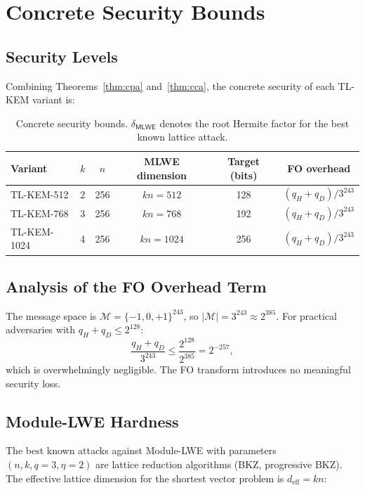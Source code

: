\documentclass[11pt,a4paper]{article}
\theoremstyle{definition}
\newcommand{\MLWE}{\textsf{MLWE}}
\begin{document}
\section{Concrete Security Bounds}
\label{sec:concrete}

\subsection{Security Levels}

Combining Theorems~\ref{thm:cpa} and~\ref{thm:cca}, the concrete security of each TL-KEM variant is:

\begin{table}[ht]
\centering
\caption{Concrete security bounds. $\delta_{\MLWE}$ denotes the root Hermite factor for the best known lattice attack.}
\label{tab:concrete}
\begin{tabular}{@{}lccccc@{}}
\toprule
Variant & $k$ & $n$ & MLWE dimension & Target (bits) & FO overhead \\
\midrule
TL-KEM-512  & 2 & 256 & $kn = 512$  & 128 & $(q_H+q_D)/3^{243}$ \\
TL-KEM-768  & 3 & 256 & $kn = 768$  & 192 & $(q_H+q_D)/3^{243}$ \\
TL-KEM-1024 & 4 & 256 & $kn = 1024$ & 256 & $(q_H+q_D)/3^{243}$ \\
\bottomrule
\end{tabular}
\end{table}

\subsection{Analysis of the FO Overhead Term}

The message space is $\mathcal{M} = \{-1,0,+1\}^{243}$, so $|\mathcal{M}| = 3^{243} \approx 2^{385}$. For practical adversaries with $q_H + q_D \leq 2^{128}$:
\[
  \frac{q_H + q_D}{3^{243}} \leq \frac{2^{128}}{2^{385}}
  = 2^{-257},
\]
which is overwhelmingly negligible. The FO transform introduces no meaningful security loss.

\subsection{Module-LWE Hardness}

The best known attacks against Module-LWE with parameters $(n, k, q=3, \eta=2)$ are lattice reduction algorithms (BKZ, progressive BKZ). The effective lattice dimension for the shortest vector problem is $d_{\text{eff}} = kn$:
\end{document}
